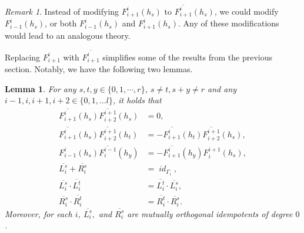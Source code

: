 \documentclass[12pt]{amsart}
\newtheorem{lemma}[theorem]{Lemma}
\theoremstyle{definition}
\theoremstyle{remark}
\newtheorem{remark}[theorem]{Remark}
\numberwithin{equation}{section}
\numberwithin{figure}{section}
\newcommand{\Li}[2]{\overline{L^{#1}_{#2}}}
\newcommand{\Ri}[2]{\overline{R^{#1}_{#2}}}
\DeclareMathOperator{\idfoam}{\mathit{id}}
\begin{document}
\begin{remark}
    Instead of modifying $F_{i+1}^i(h_s)$ to $\overline{F_{i+1}^i} (h_s)$, we could modify $F_{i-1}^i(h_{s} )$, or both $F_{i-1}^i(h_{s} )$ and $F_{i+1}^i(h_s)$. Any of these modifications would lead to an analogous theory.
\end{remark}

Replacing $F_{i+1}^i$ with $\overline{F_{i+1}^i}$ simplifies some of the results from the previous section. Notably, we have the following two lemmas.

\begin{lemma}\label{lem:Li,Ri prop}
    For any $s,t,y \in \{0,1,\cdots, r\}$, $s \neq t, s+y \neq r$ and any $i-1, i, i+1, i+2 \in \{0,1, \ldots l\}$, it holds that
\begin{align}
    \overline{F_{i+1}^i} (h_s) \overline{F_{i+2}^{i+1}} (h_s) & = 0, \\
     \overline{F_{i+1}^i} (h_s) \overline{F_{i+2}^{i+1}} (h_t) & = -\overline{F_{i+1}^i} (h_t) \overline{F_{i+2}^{i+1}} (h_s), \\
    F_{i-1}^i (h_s) \overline{F_{i}^{i-1}} (h_y) & = -\overline{F_{i+1}^{i}} (h_y)  F_{i}^{i+1} (h_s) , \label{eq:main L,R the rest vanish} \\
     \Li{s}{i} + \Ri{s}{i} &= \idfoam_{\Gamma_i},\label{eq:main L,R equation}  \\
     \Li{s}{i} \cdot \Li{t}{i} &= \Li{t}{i} \cdot \Li{s}{i}, \\
     \Ri{s}{i} \cdot \Ri{t}{i} &= \Ri{t}{i} \cdot \Ri{s}{i}.
\end{align}
Moreover, for each $i$, $\Li{s}{i},$ and $\Ri{s}{i}$ are mutually orthogonal idempotents of degree $0$. 
\end{lemma}
\end{document}
